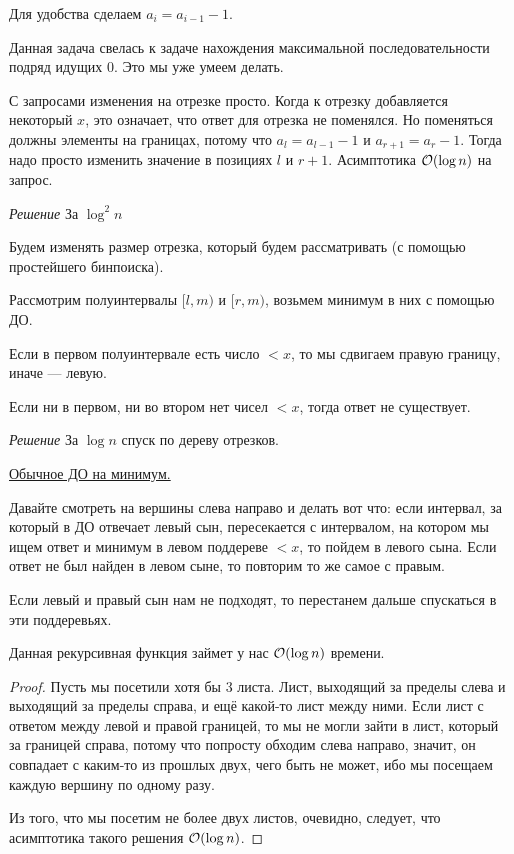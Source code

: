 Для удобства сделаем $a_i = a_{i - 1} - 1$.

Данная задача свелась к задаче нахождения максимальной последовательности подряд идущих $0$. Это мы уже умеем делать.

С запросами изменения на отрезке просто. Когда к отрезку добавляется некоторый $x$, это означает, что ответ для отрезка не поменялся. Но поменяться должны элементы на границах, потому что $a_l = a_{l - 1} - 1$ и $a_{r + 1} = a_r - 1$. Тогда надо просто изменить значение в позициях $l$ и $r + 1$. Асимптотика $\mathcal{O}(\log n)$ на запрос.

\pagebreak


{\it Решение } За $\log^2 n$	

Будем изменять размер отрезка, который будем рассматривать (с помощью простейшего бинпоиска).

Рассмотрим полуинтервалы $[l, m)$ и $[r, m)$, возьмем минимум в них с помощью ДО.

Если в первом полуинтервале есть число $< x$, то мы сдвигаем правую границу, иначе --- левую.

Если ни в первом, ни во втором нет чисел $< x$, тогда ответ не существует.

\down

{\it Решение } За $\log n$ спуск по дереву отрезков.

\href{https://codeforces.com/blog/entry/70625}{Обычное ДО на минимум.}

Давайте смотреть на вершины слева направо и делать вот что: если интервал, за который в ДО отвечает левый сын, пересекается с интервалом, на котором мы ищем ответ и минимум в левом поддереве $<x$, то пойдем в левого сына. Если ответ не был найден в левом сыне, то повторим то же самое с правым.

Если левый и правый сын нам не подходят, то перестанем дальше спускаться в эти поддеревьях.

\begin{Thm}\label{thm@splay}
	Данная рекурсивная функция займет у нас $\mathcal{O}(\log n)$ времени.
\end{Thm}

\begin{proof}
	Пусть мы посетили хотя бы 3 листа. Лист, выходящий за пределы слева и выходящий за пределы справа, и ещё какой-то лист между ними. Если лист с ответом между левой и правой границей, то мы не могли зайти в лист, который за границей справа, потому что попросту обходим слева направо, значит, он совпадает с каким-то из прошлых двух, чего быть не может, ибо мы посещаем каждую вершину по одному разу.
	
	Из того, что мы посетим не более двух листов, очевидно, следует, что асимптотика такого решения $\mathcal{O}(\log n)$.
\end{proof}


